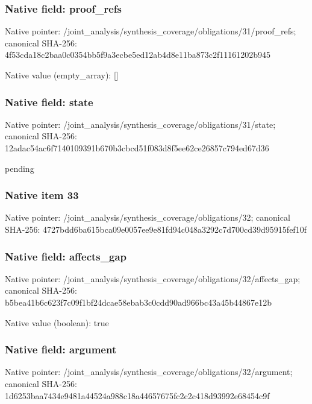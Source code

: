 \documentclass[10pt,a4paper]{article}
\begin{document}
\subsubsection{Native field: proof\_\allowbreak{}refs}
Native pointer: /joint\_\allowbreak{}analysis/synthesis\_\allowbreak{}coverage/obligations/31/proof\_\allowbreak{}refs; canonical SHA-256: 4f53cda18c2baa0c0354bb5f9a3ecbe5ed12ab4d8e11ba873c2f11161202b945

Native value (empty\_\allowbreak{}array): []

\subsubsection{Native field: state}
Native pointer: /joint\_\allowbreak{}analysis/synthesis\_\allowbreak{}coverage/obligations/31/state; canonical SHA-256: 12adac54ac6f7140109391b670b3cbcd51f083d8f5ee62ce26857c794ed67d36

\begingroup\raggedright\sloppy pending\par\endgroup

\subsubsection{Native item 33}
Native pointer: /joint\_\allowbreak{}analysis/synthesis\_\allowbreak{}coverage/obligations/32; canonical SHA-256: 4727bdd6ba615bca09e0057ee9e81fd94c048a3292c7d700cd39d95915fef10f

\subsubsection{Native field: affects\_\allowbreak{}gap}
Native pointer: /joint\_\allowbreak{}analysis/synthesis\_\allowbreak{}coverage/obligations/32/affects\_\allowbreak{}gap; canonical SHA-256: b5bea41b6c623f7c09f1bf24dcae58ebab3c0cdd90ad966bc43a45b44867e12b

Native value (boolean): true

\subsubsection{Native field: argument}
Native pointer: /joint\_\allowbreak{}analysis/synthesis\_\allowbreak{}coverage/obligations/32/argument; canonical SHA-256: 1d6253baa7434e9481a44524a988c18a44657675fc2c2c418d93992e68454c9f
\end{document}
